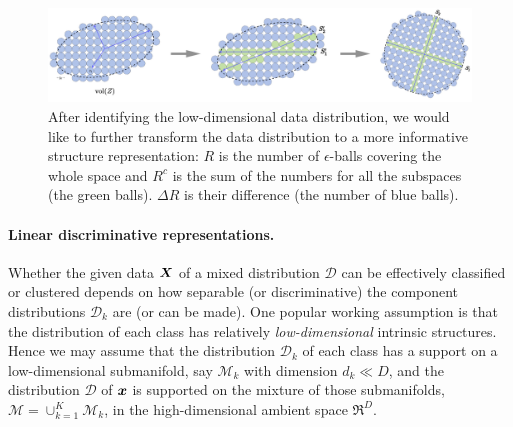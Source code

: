 \documentclass[../../book-main.tex]{subfiles}
\begin{document}


\begin{figure}[ht]
	\centering
	\includegraphics[width=0.99\linewidth]{chapters/chapter3/figs/Expansion2.png}
	\caption{After identifying the low-dimensional data distribution, we would like to further transform the data distribution to a more informative structure representation: $R$ is the number of $\epsilon$-balls covering the whole space and $R^c$ is the sum of the numbers for all the subspaces (the green balls). $\Delta R$ is their difference (the number of blue balls). }\label{fig:sphere-packing}
	\label{fig:informative-representation}
\end{figure}


\paragraph{Linear discriminative representations.}
Whether the given data $\bm{X}$ of a mixed distribution $\mathcal{D}$ can be effectively classified or clustered depends on how separable (or discriminative) the component distributions $\mathcal{D}_k$ are (or can be made). One popular working assumption is that the distribution of each class has relatively {\em low-dimensional} intrinsic structures. Hence we may assume that the distribution $\mathcal{D}_k$ of each class has a support on a low-dimensional submanifold, say $\mathcal{M}_k$ with dimension $d_k \ll D$, and the distribution $\mathcal D$ of $\bm{x}$ is supported on the mixture of those submanifolds, $\mathcal M = \cup_{k=1}^K \mathcal{M}_k$,  in the high-dimensional ambient space $\Re^D$.
\end{document}
